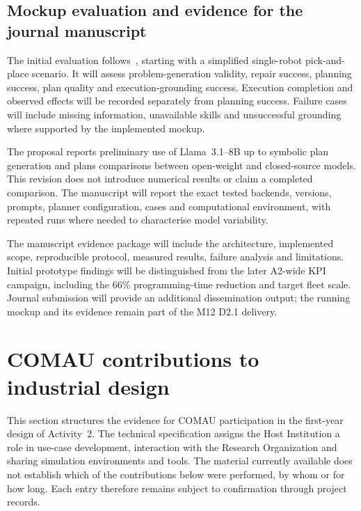 \documentclass{plan4ari_report}
\begin{document}
\subsection{Mockup evaluation and evidence for the journal manuscript}\label{sec:mockupeval}
The initial evaluation follows~\cite[Sec.~3]{sandrini2026proposal}, starting with a simplified single-robot pick-and-place scenario. It will assess problem-generation validity, repair success, planning success, plan quality and execution-grounding success. Execution completion and observed effects will be recorded separately from planning success. Failure cases will include missing information, unavailable skills and unsuccessful grounding where supported by the implemented mockup.

The proposal reports preliminary use of Llama~3.1--8B up to symbolic plan generation and plans comparisons between open-weight and closed-source models. This revision does not introduce numerical results or claim a completed comparison. The manuscript will report the exact tested backends, versions, prompts, planner configuration, cases and computational environment, with repeated runs where needed to characterise model variability.

The manuscript evidence package will include the architecture, implemented scope, reproducible protocol, measured results, failure analysis and limitations. Initial prototype findings will be distinguished from the later A2-wide KPI campaign, including the 66\% programming-time reduction and target fleet scale. Journal submission will provide an additional dissemination output; the running mockup and its evidence remain part of the M12 D2.1 delivery.

\section{COMAU contributions to industrial design}\label{sec:comau}

This section structures the evidence for COMAU participation in the first-year design of Activity~2. The technical specification assigns the Host Institution a role in use-case development, interaction with the Research Organization and sharing simulation environments and tools. The material currently available does not establish which of the contributions below were performed, by whom or for how long. Each entry therefore remains subject to confirmation through project records.
\end{document}
